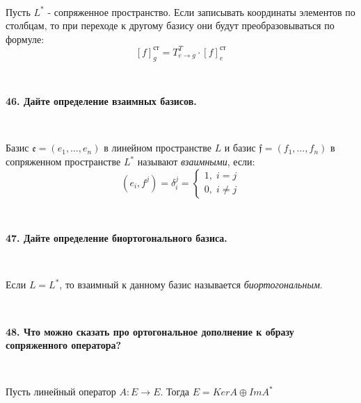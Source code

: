 \documentclass{article}
\begin{document}
    {
        $\;$
        \setlength{\parindent}{0.4cm}
        \hangindent=0.4cm

    Пусть $L^*$ - сопряженное пространство. Если записывать координаты элементов по столбцам, то при переходе к другому базису они будут преобразовываться по формуле:
        $$
        [f]_g^{\text{ст}} = T_{e \rightarrow g}^T \cdot [f]_e^{\text{ст}}
        $$

        $\;$
        \setlength{\parindent}{0cm}
        \hangindent=0cm
    }

    \textbf{46. Дайте определение взаимных базисов.}

    {
        $\;$
        \setlength{\parindent}{0.4cm}
        \hangindent=0.4cm

    Базис $\mathfrak{e}=(e_1,\dots,e_n)$ в линейном пространстве $L$ и базис $\mathfrak{f} = (f_1, \dots,f_n)$ в сопряженном пространстве $L^*$ называют \textit{взаимными}, если:
        $$
        (e_i, f^j) = \delta_i^j=\begin{cases}
                                    1, \; i = j \\
                                    0, \; i \not = j
    \end{cases}
        $$

        $\;$
        \setlength{\parindent}{0cm}
        \hangindent=0cm
    }

    \textbf{47. Дайте определение биортогонального базиса.}

    {
        $\;$
        \setlength{\parindent}{0.4cm}
        \hangindent=0.4cm

    Если $L = L^*$, то взаимный к данному базис называется \textit{биортогональным}.

        $\;$
        \setlength{\parindent}{0cm}
        \hangindent=0cm
    }

    \textbf{48. Что можно сказать про ортогональное дополнение к образу сопряженного оператора?}

    {
        $\;$
        \setlength{\parindent}{0.4cm}
        \hangindent=0.4cm

    Пусть линейный оператор $A:E\rightarrow E$. Тогда $E=KerA\oplus ImA^*$\\

        $\;$
        \setlength{\parindent}{0cm}
        \hangindent=0cm
    }
\end{document}
